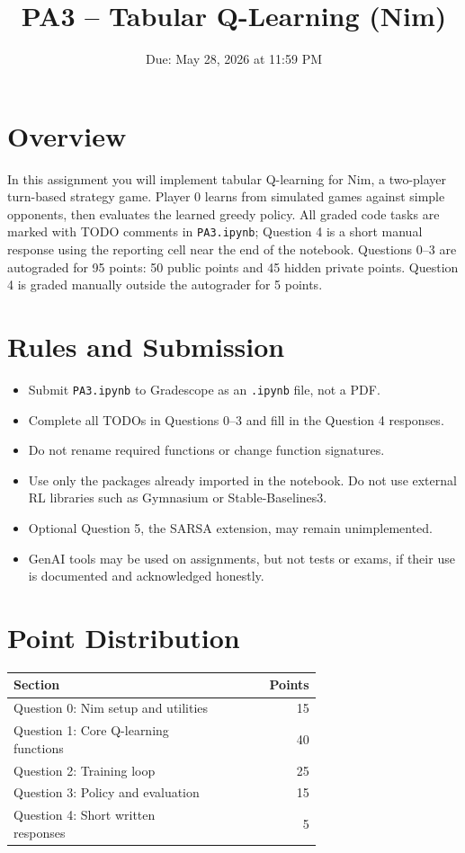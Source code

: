 \documentclass[11pt]{article}
\title{PA3 -- Tabular Q-Learning (Nim)}
\date{Due: May 28, 2026 at 11:59 PM}
\begin{document}
\maketitle

\section*{Overview}
In this assignment you will implement tabular Q-learning for Nim, a two-player
turn-based strategy game. Player 0 learns from simulated games against simple
opponents, then evaluates the learned greedy policy. All graded code tasks are
marked with TODO comments in \texttt{PA3.ipynb}; Question 4 is a short manual
response using the reporting cell near the end of the notebook.
Questions 0--3 are autograded for 95 points: 50 public points and 45 hidden
private points. Question 4 is graded manually outside the autograder for 5
points.

\section*{Rules and Submission}
\begin{itemize}
  \item Submit \texttt{PA3.ipynb} to Gradescope as an \texttt{.ipynb} file, not a PDF.
  \item Complete all TODOs in Questions 0--3 and fill in the Question 4 responses.
  \item Do not rename required functions or change function signatures.
  \item Use only the packages already imported in the notebook. Do not use external RL libraries such as Gymnasium or Stable-Baselines3.
  \item Optional Question 5, the SARSA extension, may remain unimplemented.
  \item GenAI tools may be used on assignments, but not tests or exams, if their use is documented and acknowledged honestly.
\end{itemize}

\section*{Point Distribution}
\begin{center}
\begin{tabular}{|>{\raggedright\arraybackslash}p{0.68\linewidth}|r|}
\hline
\textbf{Section} & \textbf{Points} \\
\hline
Question 0: Nim setup and utilities & 15 \\
\hline
Question 1: Core Q-learning functions & 40 \\
\hline
Question 2: Training loop & 25 \\
\hline
Question 3: Policy and evaluation & 15 \\
\hline
Question 4: Short written responses & 5 \\
\hline
\end{tabular}
\end{center}
\end{document}
